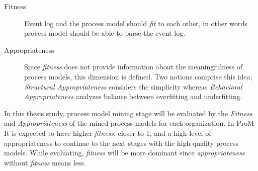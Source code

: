 \begin{description}
  \item[Fitness] Event log and the process model should \textit{fit} to each other, in other words process model should be able to parse the event log. 
  \item[Appropriateness] Since \textit{fitness} does not provide information about the meaningfulness of process models, this dimension is defined. Two notions comprise this idea; \textit{Structural Appropriateness} considers the simplicity whereas \textit{Behavioral Appropriateness} analyzes balance between overfitting and underfitting.
\end{description}

In this thesis study, process model mining stage will be evaluated by the \textit{Fitness} and \textit{Appropriateness} of the mined process models for each organization. In ProM  It is expected to have higher \textit{fitness}, closer to 1, and a high level of appropriateness to continue to the next stages with the high quality process models. While evaluating, \textit{fitness} will be more dominant since \textit{appropriateness} without \textit{fitness} means less.
